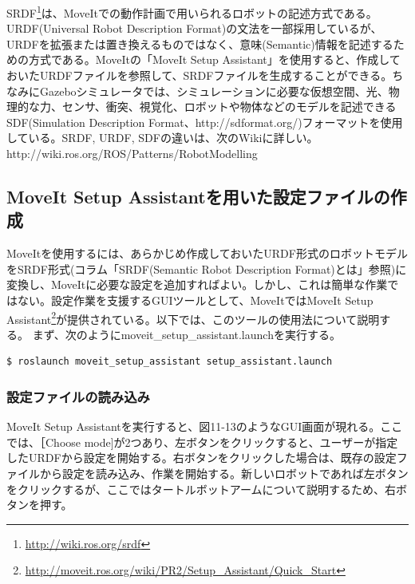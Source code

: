 \begin{exercise}
SRDF\footnote{\url{http://wiki.ros.org/srdf}}は、MoveItでの動作計画で用いられるロボットの記述方式である。URDF(Universal Robot Description Format)の文法を一部採用しているが、URDFを拡張または置き換えるものではなく、意味(Semantic)情報を記述するための方式である。MoveItの「MoveIt Setup Assistant」を使用すると、作成しておいたURDFファイルを参照して、SRDFファイルを生成することができる。ちなみにGazeboシミュレータでは、シミュレーションに必要な仮想空間、光、物理的な力、センサ、衝突、視覚化、ロボットや物体などのモデルを記述できるSDF(Simulation Description Format、http://sdformat.org/)フォーマットを使用している。SRDF, URDF, SDFの違いは、次のWikiに詳しい。\\
http://wiki.ros.org/ROS/Patterns/RobotModelling
\end{exercise}

\subsection{MoveIt Setup Assistantを用いた設定ファイルの作成}

MoveItを使用するには、あらかじめ作成しておいたURDF形式のロボットモデルをSRDF形式(コラム「SRDF(Semantic Robot Description Format)とは」参照)に変換し、MoveItに必要な設定を追加すればよい。しかし、これは簡単な作業ではない。設定作業を支援するGUIツールとして、MoveItではMoveIt Setup Assistant\footnote{\url{http://moveit.ros.org/wiki/PR2/Setup\_Assistant/Quick\_Start}}が提供されている。以下では、このツールの使用法について説明する。
まず、次のようにmoveit\_setup\_assistant.launchを実行する。

\begin{lstlisting}[language=ROS]
$ roslaunch moveit_setup_assistant setup_assistant.launch
\end{lstlisting}

\subsubsection{設定ファイルの読み込み}

MoveIt Setup Assistantを実行すると、図11-13のようなGUI画面が現れる。ここでは、［Choose mode]が2つあり、左ボタンをクリックすると、ユーザーが指定したURDFから設定を開始する。右ボタンをクリックした場合は、既存の設定ファイルから設定を読み込み、作業を開始する。新しいロボットであれば左ボタンをクリックするが、ここではタートルボットアームについて説明するため、右ボタンを押す。

